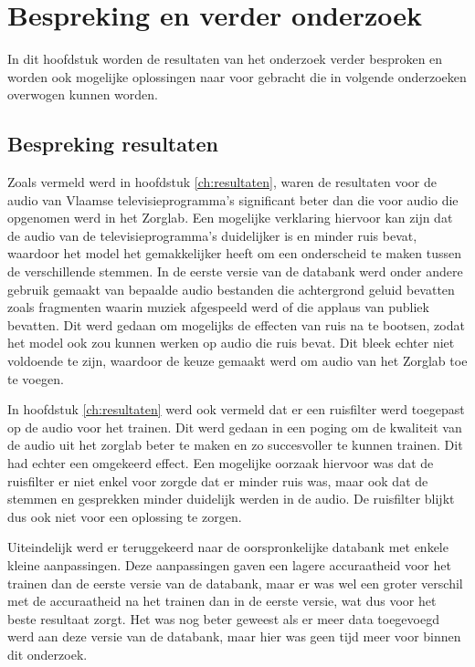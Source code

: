 
\chapter{Bespreking en verder onderzoek}
\label{ch:bespreking}
In dit hoofdstuk worden de resultaten van het onderzoek verder besproken en worden ook mogelijke oplossingen naar voor gebracht die in volgende onderzoeken overwogen kunnen worden.

\section{Bespreking resultaten}
\label{sec:bespr-res}
Zoals vermeld werd in hoofdstuk \ref{ch:resultaten}, waren de resultaten voor de audio van Vlaamse televisieprogramma's significant beter dan die voor audio die opgenomen werd in het Zorglab. Een mogelijke verklaring hiervoor kan zijn dat de audio van de televisieprogramma's duidelijker is en minder ruis bevat, waardoor het model het gemakkelijker heeft om een onderscheid te maken tussen de verschillende stemmen. In de eerste versie van de databank werd onder andere gebruik gemaakt van bepaalde audio bestanden die achtergrond geluid bevatten zoals fragmenten waarin muziek afgespeeld werd of die applaus van publiek bevatten. Dit werd gedaan om mogelijks de effecten van ruis na te bootsen, zodat het model ook zou kunnen werken op audio die ruis bevat. Dit bleek echter niet voldoende te zijn, waardoor de keuze gemaakt werd om audio van het Zorglab toe te voegen.

In hoofdstuk \ref{ch:resultaten} werd ook vermeld dat er een ruisfilter werd toegepast op de audio voor het trainen. Dit werd gedaan in een poging om de kwaliteit van de audio uit het zorglab beter te maken en zo succesvoller te kunnen trainen. Dit had echter een omgekeerd effect. Een mogelijke oorzaak hiervoor was dat de ruisfilter er niet enkel voor zorgde dat er minder ruis was, maar ook dat de stemmen en gesprekken minder duidelijk werden in de audio. De ruisfilter blijkt dus ook niet voor een oplossing te zorgen.

Uiteindelijk werd er teruggekeerd naar de oorspronkelijke databank met enkele kleine aanpassingen. Deze aanpassingen gaven een lagere accuraatheid voor het trainen dan de eerste versie van de databank, maar er was wel een groter verschil met de accuraatheid na het trainen dan in de eerste versie, wat dus voor het beste resultaat zorgt. Het was nog beter geweest als er meer data toegevoegd werd aan deze versie van de databank, maar hier was geen tijd meer voor binnen dit onderzoek. 

